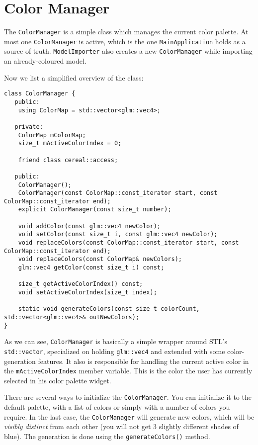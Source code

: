 \section{Color Manager}

The \texttt{ColorManager} is a simple class which manages the current color palette. At most one \texttt{ColorManager} is active, which is the one \texttt{MainApplication} holds as a source of truth. \texttt{ModelImporter} also creates a new \texttt{ColorManager} while importing an already-coloured model.

Now we list a simplified overview of the class:

\begin{lstlisting}
class ColorManager {
   public:
    using ColorMap = std::vector<glm::vec4>;

   private:
    ColorMap mColorMap;
    size_t mActiveColorIndex = 0;

    friend class cereal::access;

   public:
    ColorManager();
    ColorManager(const ColorMap::const_iterator start, const ColorMap::const_iterator end);
    explicit ColorManager(const size_t number);

    void addColor(const glm::vec4 newColor);
    void setColor(const size_t i, const glm::vec4 newColor);
    void replaceColors(const ColorMap::const_iterator start, const ColorMap::const_iterator end);
    void replaceColors(const ColorMap& newColors);
    glm::vec4 getColor(const size_t i) const;

    size_t getActiveColorIndex() const;
    void setActiveColorIndex(size_t index);

    static void generateColors(const size_t colorCount, std::vector<glm::vec4>& outNewColors);
}
\end{lstlisting}

As we can see, \texttt{ColorManager} is basically a simple wrapper around STL's \texttt{std::vector}, specialized on holding \texttt{glm::vec4} and extended with some color-generation features. It also is responsible for handling the current active color in the \texttt{mActiveColorIndex} member variable. This is the color the user has currently selected in his color palette widget.

There are several ways to initialize the \texttt{ColorManager}. You can initialize it to the default palette, with a list of colors or simply with a number of colors you require. In the last case, the \texttt{ColorManager} will generate new colors, which will be \textit{visibly distinct} from each other (you will not get 3 slightly different shades of blue). The generation is done using the \texttt{generateColors()} method.

